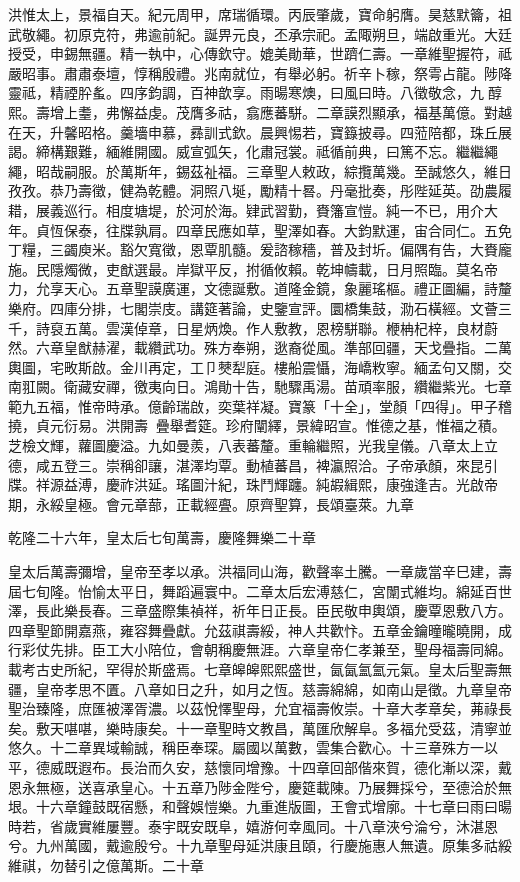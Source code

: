 \begin{pinyinscope}
洪惟太上，景福自天。紀元周甲，席瑞循環。丙辰肇歲，寶命躬膺。昊慈默籥，祖武敬繩。初原克符，弗逾前紀。誕畀元良，丕承宗祀。孟陬朔旦，端啟重光。大廷授受，申錫無疆。精一執中，心傳欽守。媲美勛華，世躋仁壽。一章維聖握符，祗嚴昭事。肅肅泰壇，惇稱殷禮。兆南就位，有舉必躬。祈辛卜稼，祭雩占龍。陟降靈祗，精禋肸蚃。四序鈞調，百神歆享。雨暘寒燠，曰風曰時。八徵敬念，九醇熙。壽增上耋，弗懈益虔。茂膺多祜，翕應蕃駢。二章謨烈顯承，福基萬億。對越在天，升馨昭格。羹墻申慕，彞訓式欽。晨興惕若，寶籙披尋。四蒞陪都，珠丘展謁。締構艱難，緬維開國。威宣弧矢，化肅冠裳。祗循前典，曰篤不忘。繼繼繩繩，昭哉嗣服。於萬斯年，錫茲祉福。三章聖人敕政，綜攬萬幾。至誠悠久，維日孜孜。恭乃壽徵，健為乾體。洞照八埏，勵精十晷。丹毫批奏，彤陛延英。劭農履耤，展義巡行。相度塘堤，於河於海。肄武習勤，賚籓宣愷。純一不已，用介大年。貞恆保泰，往牒孰肩。四章民應如草，聖澤如春。大鈞默運，宙合同仁。五免丁糧，三蠲庾米。豁欠寬徵，恩覃肌髓。爰諮稼穡，普及封圻。偏隅有告，大賚龐施。民隱燭微，吏猷選最。岸獄平反，拊循攸賴。乾坤幬載，日月照臨。莫名帝力，允享天心。五章聖謨廣運，文德誕敷。道隆金鏡，象麗瑤樞。禮正圖編，詩釐樂府。四庫分排，七閣崇庋。講筵著論，史鑒宣評。圜橋集鼓，泐石橫經。文薈三千，詩裒五萬。雲漢倬章，日星炳煥。作人敷教，恩榜駢聯。楩柟杞梓，良材蔚然。六章皇猷赫濯，載纘武功。殊方奉朔，逖裔從風。準部回疆，天戈疊指。二萬輿圖，宅畋斯啟。金川再定，工⼙僰犁庭。樓船震懾，海嶠敉寧。緬孟句又關，交南羾闕。衛藏安禪，徼夷向日。鴻勛十告，馳驟禹湯。苗頑率服，纘繼紫光。七章範九五福，惟帝時承。億齡瑞啟，奕葉祥凝。寶篆「十全」，堂顏「四得」。甲子稽撓，貞元衍易。洪開壽，疊舉耆筵。珍府闡繹，景緯昭宣。惟德之基，惟福之積。芝檢文輝，蘿圖慶溢。九如曼羨，八表蕃釐。重輪繼照，光我皇儀。八章太上立德，咸五登三。崇稱卻讓，湛澤均覃。動植蕃昌，裨瀛照洽。子帝承顏，來昆引牒。祥源益溥，慶祚洪延。瑤圖汁紀，珠鬥輝躔。純嘏緝熙，康強逢吉。光啟帝期，永綏皇極。會元章蔀，正載經亹。原齊聖算，長頌臺萊。九章

乾隆二十六年，皇太后七旬萬壽，慶隆舞樂二十章

皇太后萬壽彌增，皇帝至孝以承。洪福同山海，歡聲率土騰。一章歲當辛巳建，壽屆七旬隆。怡愉太平日，舞蹈遍寰中。二章太后宏溥慈仁，宮闈式維均。綿延百世澤，長此樂長春。三章盛際集禎祥，祈年日正長。臣民敬申輿頌，慶覃恩敷八方。四章聖節開嘉燕，雍容舞疊獻。允茲祺壽綏，神人共歡忭。五章金鑰曈曨曉開，成行彩仗先排。臣工大小陪位，會朝稱慶無涯。六章皇帝仁孝兼至，聖母福壽同綿。載考古史所紀，罕得於斯盛焉。七章皞皞熙熙盛世，氤氤氳氳元氣。皇太后聖壽無疆，皇帝孝思不匱。八章如日之升，如月之恆。慈壽綿綿，如南山是徵。九章皇帝聖治臻隆，庶匯被澤胥濃。以茲悅懌聖母，允宜福壽攸崇。十章大孝章矣，茀祿長矣。敷天啿啿，樂時康矣。十一章聖時文教昌，萬匯欣解阜。多福允受茲，清寧並悠久。十二章異域輸誠，稱臣奉琛。屬國以萬數，雲集合歡心。十三章殊方一以平，德威既遐布。長治而久安，慈懷同增豫。十四章回部偕來賀，德化漸以深，戴恩永無極，送喜承皇心。十五章乃陟金陛兮，慶筵載陳。乃展舞採兮，至德洽於無垠。十六章鐘鼓既宿懸，和聲娛愷樂。九重進版圖，王會式增廓。十七章曰雨曰暘時若，省歲實維屢豐。泰宇既安既阜，嬉游何幸風同。十八章浹兮淪兮，沐湛恩兮。九州萬國，戴逾殷兮。十九章聖母延洪康且頤，行慶施惠人無遺。原集多祜綏維祺，勿替引之億萬斯。二十章


\end{pinyinscope}
